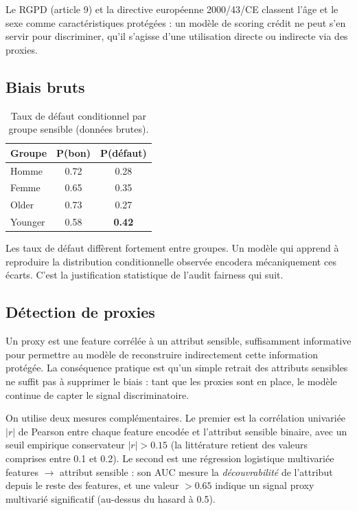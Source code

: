 \documentclass[11pt, a4paper]{article}
\begin{document}
Le RGPD (article 9) et la directive européenne 2000/43/CE classent l'âge et le sexe comme caractéristiques protégées : un modèle de scoring crédit ne peut s'en servir pour discriminer, qu'il s'agisse d'une utilisation directe ou indirecte via des proxies.

\subsection{Biais bruts}

\begin{table}[H]
\centering
\begin{tabular}{lcc}
\toprule
\textbf{Groupe} & \textbf{P(bon)} & \textbf{P(défaut)} \\
\midrule
Homme    & 0.72 & 0.28 \\
Femme    & 0.65 & 0.35 \\
\midrule
Older    & 0.73 & 0.27 \\
Younger  & 0.58 & \textbf{0.42} \\
\bottomrule
\end{tabular}
\caption{Taux de défaut conditionnel par groupe sensible (données brutes).}
\end{table}

Les taux de défaut diffèrent fortement entre groupes. Un modèle qui apprend à reproduire la distribution conditionnelle observée encodera mécaniquement ces écarts. C'est la justification statistique de l'audit fairness qui suit.

\subsection{Détection de proxies}
\label{sec:proxies-early}

Un proxy est une feature corrélée à un attribut sensible, suffisamment informative pour permettre au modèle de reconstruire indirectement cette information protégée. La conséquence pratique est qu'un simple retrait des attributs sensibles ne suffit pas à supprimer le biais : tant que les proxies sont en place, le modèle continue de capter le signal discriminatoire.

On utilise deux mesures complémentaires. Le premier est la corrélation univariée $|r|$ de Pearson entre chaque feature encodée et l'attribut sensible binaire, avec un seuil empirique conservateur $|r| > 0.15$ (la littérature retient des valeurs comprises entre 0.1 et 0.2). Le second est une régression logistique multivariée features $\to$ attribut sensible : son AUC mesure la \emph{découvrabilité} de l'attribut depuis le reste des features, et une valeur $> 0.65$ indique un signal proxy multivarié significatif (au-dessus du hasard à 0.5).
\end{document}
